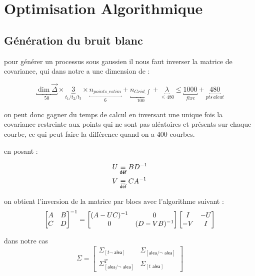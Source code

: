 \section{Optimisation Algorithmique}

\subsection{Génération du bruit blanc}

pour générer un processus sous gaussien il nous faut inverser la matrice de covariance, qui dans notre a une dimension de :

\begin{equation*}
	\underbracket{\dim \vec\Delta}_{50} \times \underbracket{3}_{t_1 / t_2 / t_3} \times \underbracket{n_{points\_estim}}_{6} + \underbracket{n_{Grid\_\int}}_{100} + \underbracket{\lambda}_{\leq 480} \leq \underbracket{1000}_{fixe} + \underbracket{480}_{pts \, aleat}
\end{equation*}

on peut donc gagner du temps de calcul en inversant une unique fois la covariance restreinte aux points qui ne sont pas aléatoires et présents sur chaque courbe, ce qui peut faire la différence quand on a 400 courbes.

en posant :


\begin{align*}
	U & \isdef B \inverse D \\
	V & \isdef C \inverse A
\end{align*}


on obtient l'inversion de la matrice par blocs avec l'algorithme suivant :
\begin{equation*}
	\begin{bmatrix}
		A & B \\
		C & D
	\end{bmatrix}^{-1}
	=
	\begin{bmatrix}
		\inverse{(A - UC)} & 0                  \\
		0                  & \inverse{(D - VB)}
	\end{bmatrix}
	\begin{bmatrix}
		I   & - U \\
		- V & I
	\end{bmatrix}
\end{equation*}

dans notre cas
\begin{equation*}
	\Sigma = \begin{bmatrix}
		\Sigma_{[t \neg\textsf{ alea}]} & \Sigma_{[\textsf{alea} / \neg \textsf{ alea}]}
		\\ \Sigma^T_{[\textsf{alea} / \neg \textsf{ alea}]}
		                                & \Sigma_{[t \textsf{ alea}]}
	\end{bmatrix}
\end{equation*}

